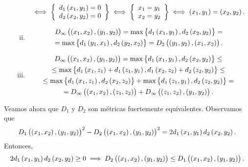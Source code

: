 \begin{ej}
\begin{enumerate}[(a)]
\begin{enumerate}[i)]
\begin{gather*}
                \iff \left\{ \begin{array}{c}
                    d_1 \left( x_1, y_1 \right) = 0 \\
                    d_2 \left( x_2, y_2 \right) = 0
                \end{array} \right\} \iff  \left\{ \begin{array}{c}
                    x_1=y_1 \\
                    x_2=y_2
                \end{array} \right\} \iff \left( x_1, y_1 \right) = \left( x_2, y_2 \right).
            \end{gather*}
            \item 
            \begin{gather*}
                D_{\infty} \left( \left( x_1, x_2 \right) , \left( y_1 , y_2 \right) \right) = \max \left\{ d_1 \left( x_1, y_1\right)  , d_2 \left( x_2 , y_2 \right) \right\} = \\
                = \max \left\{ d_1 \left( y_1, x_1\right) , d_2 \left( y_2 , x_2 \right) \right\} =D_2 \left( \left( y_1, y_2 \right) , \left( x_1 , x_2 \right) \right) .
            \end{gather*}
            \item 
            \begin{gather*}
                D_{\infty} \left( \left( x_1, x_2 \right) , \left( y_1 , y_2 \right) \right) = \max \left\{ d_1 \left( x_1, y_1\right) , d_2 \left( x_2 , y_2 \right) \right\} \leq \\
                \leq \max \left\{ d_1 \left( x_1, z_1 \right) +d_1 \left( z_1, y_1 \right) , d_1 \left( x_2, z_2 \right) +d_2 \left( z_2, y_2 \right)  \right\} \leq \\
                \leq \max \left\{ d_1 \left( x_1, z_1\right) , d_2 \left( x_2 , z_2 \right) \right\} + \max \left\{ d_1 \left( z_1, y_1\right) , d_2 \left( z_2 , y_2 \right) \right\} = \\
                = D_{\infty} \left( \left( x_1, x_2 \right) , \left( z_1 , z_2 \right) \right) + D_{\infty} \left( \left( z_1, z_2 \right) , \left( y_1 , y_2 \right) \right).
            \end{gather*}
		\end{enumerate}
	\end{enumerate}
    Veamos ahora que $D_1$ y $D_2$ son métricas fuertemente equivalentes. Observamos que
    \[
        D_1 \left( \left( x_1, x_2 \right) , \left( y_1 , y_2 \right) \right)^2-D_2 \left( \left( x_1, x_2 \right) , \left( y_1 , y_2 \right) \right)^2=2d_1\left( x_1, y_1 \right) d_2 \left( x_2, y_2 \right).
    \]
    Entonces,
    \[
        2d_1\left( x_1, y_1 \right) d_2 \left( x_2, y_2 \right) \geq 0 \implies D_2 \left( \left( x_1, x_2 \right) , \left( y_1 , y_2 \right) \right) \leq D_1 \left( \left( x_1, x_2 \right) , \left( y_1 , y_2 \right) \right).
\]
\end{ej}
